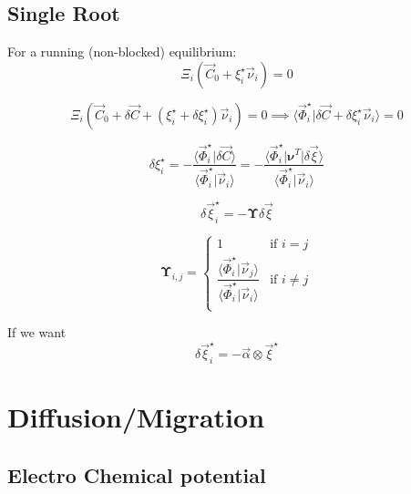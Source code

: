 \documentclass[aps,12pt]{revtex4}
\begin{document}
\subsection{Single Root}

For a running (non-blocked) equilibrium:
\begin{equation}
	\Xi_i(\vec C_0 + \xi_i^\star \vec \nu_i ) = 0
\end{equation}

\begin{equation}
	\Xi_i(\vec C_0 + \delta \vec C + (\xi_i^\star + \delta  \xi_i^\star)\vec \nu_i  ) = 0
	\implies
	\langle \vec \Phi_i^\star \vert \delta \vec C +  \delta \xi_i^\star \vec \nu_i \rangle = 0
\end{equation}

\begin{equation}
	 \delta \xi_i^\star = - \dfrac{\langle \vec \Phi_i^\star \vert \delta \vec C \rangle }
	 { \langle \vec \Phi_i^\star \vert \vec \nu_i \rangle  }
	 =
	  - \dfrac{\langle \vec \Phi_i^\star \vert \bm{\nu}^T \vert \delta \vec \xi \rangle }
	 { \langle \vec \Phi_i^\star \vert \vec \nu_i \rangle  }
\end{equation}

\begin{equation}
	\delta \vec \xi_i ^\star = - \bm\Upsilon \delta \vec \xi
\end{equation}

\begin{equation}
	\bm\Upsilon_{i,j} = 
	\left\lbrace
	\begin{array}{rl}
	1 & \text{if } i=j\\
	\dfrac{\langle \vec \Phi_i^\star \vert \vec \nu_j \rangle }{\langle \vec \Phi_i^\star \vert \vec \nu_i \rangle } & \text{if } i\not=j\\
	\end{array}
	\right.
\end{equation}

If we want
\begin{equation}
	\delta \vec \xi_i ^\star = - \vec \alpha \otimes \vec \xi ^\star
\end{equation}


\section{Diffusion/Migration}

\subsection{Electro Chemical potential}
\end{document}
